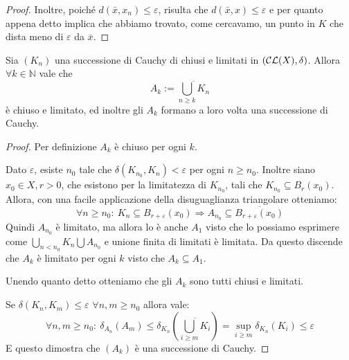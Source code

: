 \begin{proof}
	Inoltre, poiché $d(\bar x,x_n)\le \varepsilon$, risulta che $d(\bar x, x)\le \varepsilon$ e per quanto appena detto implica che abbiamo trovato, come cercavamo, un punto in $K$ che dista meno di $\varepsilon$ da $\bar x$.
	
\end{proof}

\begin{lemma} \label{UnioniDiCauchy}
Sia $(K_n)$ una successione di Cauchy di chiusi e limitati in $\left (\mathcal{CL}(X),\delta\right  ) $. 
Allora $\forall k \in \mathbb{N}$ vale che
\begin{equation*}
A_k:=\overline{\bigcup_{n\geq k} K_n}
\end{equation*}
è chiuso e limitato, ed inoltre gli $A_k$ formano a loro volta una successione di Cauchy.
\end{lemma}

\begin{proof}
Per definizione $A_k$ è chiuso per ogni $k$. 

Dato $\varepsilon$, esiste $n_0$ tale che $\delta(K_{n_0}, K_n)< \varepsilon$ per ogni $n\geq n_0$. 
Inoltre siano $x_0\in X,r>0$, che esistono per la limitatezza di $K_{n_0}$, tali che $K_{n_0}\subseteq B_r(x_0)$. 
Allora, con una facile applicazione della disuguaglianza triangolare otteniamo:
\begin{equation*}
	\forall n\ge n_0:\ K_n\subseteq B_{r+\varepsilon}(x_0) \Rightarrow A_{n_0}\subseteq \overline{B_{r+\varepsilon}(x_0)}
\end{equation*}
Quindi $A_{n_0}$ è limitato, ma allora lo è anche $A_1$ visto che lo possiamo esprimere come $\bigcup_{n<n_0}K_n \bigcup A_{n_0}$ e unione finita di limitati è limitata. Da questo discende che $A_k$ è limitato per ogni $k$ visto che $A_k\subseteq A_1$.

Unendo quanto detto otteniamo che gli $A_k$ sono tutti chiusi e limitati.

Se $\delta(K_n, K_m)\leq \varepsilon$ $\forall n,m \geq n_0$  allora vale:
\begin{equation*}
	\forall n,m\ge n_0:\ \delta_{A_n}(A_m)\le \delta_{K_n}\left(\overline{\bigcup_{i\ge m}K_i} \right)
	=\sup_{i\ge m} \delta_{K_n}(K_i) \le \varepsilon
\end{equation*}
E questo dimostra che $(A_k)$ è una successione di Cauchy.
\end{proof}

